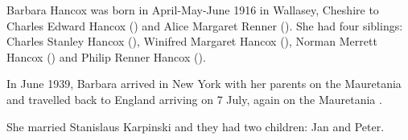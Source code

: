 
Barbara Hancox was born in April-May-June 1916 in Wallasey, Cheshire to Charles Edward Hancox () and Alice Margaret Renner ()\cite{BarbaraHancoxBirth}.  She had four siblings: Charles Stanley Hancox (), Winifred Margaret Hancox (), Norman Merrett Hancox () and Philip Renner Hancox ().

In June 1939, Barbara arrived in New York with her parents on the Mauretania  and travelled back to England arriving on 7 July, again on the Mauretania \cite{BarbaraHancoxTravel}.

She married Stanislaus Karpinski and they had two children: Jan and Peter.
